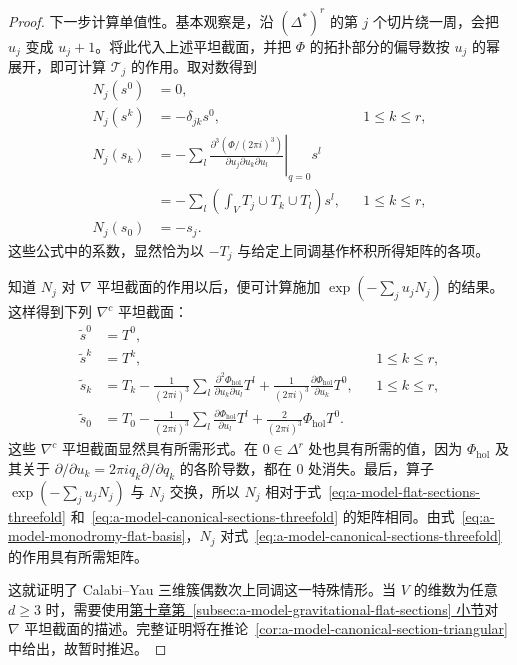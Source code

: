 \begin{proof}
下一步计算单值性。基本观察是，沿 $(\Delta^*)^r$ 的第 $j$ 个切片绕一周，会把 $u_j$ 变成 $u_j+1$。将此代入上述平坦截面，并把 $\Phi$ 的拓扑部分的偏导数按 $u_j$ 的幂展开，即可计算 $\mathcal T_j$ 的作用。取对数得到
\begin{equation}\label{eq:a-model-monodromy-flat-basis}
\begin{aligned}
N_j(s^0)&=0,\\
N_j(s^k)&=-\delta_{jk}s^0,&&1\le k\le r,\\
N_j(s_k)&=-\sum_l\left.\frac{\partial^3(\Phi/(2\pi i)^3)}{\partial u_j\partial u_k\partial u_l}\right|_{q=0}s^l\\
&=-\sum_l\left(\int_VT_j\cup T_k\cup T_l\right)s^l,&&1\le k\le r,\\
N_j(s_0)&=-s_j.
\end{aligned}
\end{equation}
这些公式中的系数，显然恰为以 $-T_j$ 与给定上同调基作杯积所得矩阵的各项。

知道 $N_j$ 对 $\nabla$ 平坦截面的作用以后，便可计算施加 $\exp(-\sum_ju_jN_j)$ 的结果。这样得到下列 $\nabla^c$ 平坦截面：
\begin{equation}\label{eq:a-model-canonical-sections-threefold}
\begin{aligned}
\widetilde s^0&=T^0,\\
\widetilde s^k&=T^k,&&1\le k\le r,\\
\widetilde s_k&=T_k-\frac1{(2\pi i)^3}\sum_l\frac{\partial^2\Phi_{\mathrm{hol}}}{\partial u_k\partial u_l}T^l
+\frac1{(2\pi i)^3}\frac{\partial\Phi_{\mathrm{hol}}}{\partial u_k}T^0,&&1\le k\le r,\\
\widetilde s_0&=T_0-\frac1{(2\pi i)^3}\sum_l\frac{\partial\Phi_{\mathrm{hol}}}{\partial u_l}T^l
+\frac2{(2\pi i)^3}\Phi_{\mathrm{hol}}T^0.
\end{aligned}
\end{equation}
这些 $\nabla^c$ 平坦截面显然具有所需形式。在 $0\in\Delta^r$ 处也具有所需的值，因为 $\Phi_{\mathrm{hol}}$ 及其关于 $\partial/\partial u_k=2\pi iq_k\partial/\partial q_k$ 的各阶导数，都在 $0$ 处消失。最后，算子 $\exp(-\sum_ju_jN_j)$ 与 $N_j$ 交换，所以 $N_j$ 相对于式~\eqref{eq:a-model-flat-sections-threefold} 和~\eqref{eq:a-model-canonical-sections-threefold} 的矩阵相同。由式~\eqref{eq:a-model-monodromy-flat-basis}，$N_j$ 对式~\eqref{eq:a-model-canonical-sections-threefold} 的作用具有所需矩阵。

这就证明了 Calabi--Yau 三维簇偶数次上同调这一特殊情形。当 $V$ 的维数为任意 $d\ge3$ 时，需要使用\hyperref[chap:quantum-differential-equations]{第十章}\hyperref[subsec:a-model-gravitational-flat-sections]{第~\ref*{subsec:a-model-gravitational-flat-sections} 小节}对 $\nabla$ 平坦截面的描述。完整证明将在推论~\ref{cor:a-model-canonical-section-triangular} 中给出，故暂时推迟。
\end{proof}
